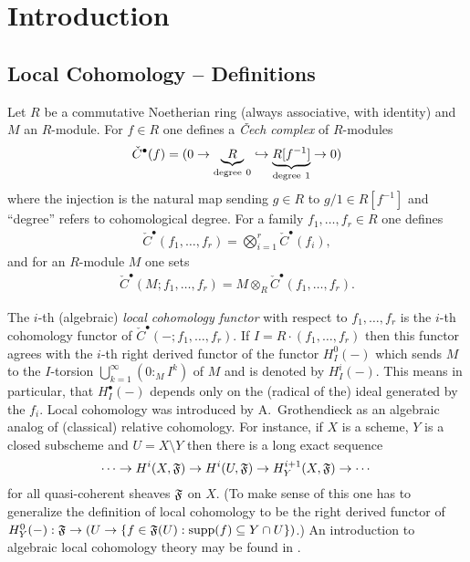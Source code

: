 %


\section{Introduction}

\subsection{Local Cohomology -- Definitions} 
Let $R$ be a commutative Noetherian ring (always associative, 
with identity) and $M$ an 
$R$-module. For $f\in R$ one defines a {\em \v Cech complex} of $R$-modules
\begin{eqnarray}
\check
C^\bullet(f)=(0\to \underbrace{R}_{\text{degree}\ 0}\hookrightarrow 
\underbrace{R[f^{-1}]}_{\text{degree}\ 1}\to 0)
\end{eqnarray}
where
the injection is the natural map sending $g\in R$ to ${g}/{1}\in
R[f^{-1}]$ and ``degree'' refers to  cohomological degree. 
For a family $f_1,\ldots,f_r\in R$ one defines 
\begin{eqnarray}
\check
C^\bullet(f_1,\ldots,f_r)=\bigotimes_{i=1}^r\check C^\bullet(f_i),
\end{eqnarray}
and for
an $R$-module $M$ one sets 
\begin{eqnarray}
\check C^\bullet(M;f_1,\ldots,f_r)=M\otimes_R \check
C^\bullet(f_1,\ldots,f_r).
\end{eqnarray}


The $i$-th (algebraic) {\em local
cohomology functor}
 with respect to $f_1,\ldots,f_r$ is the $i$-th 
cohomology functor of $\check C^\bullet(-;f_1,\ldots,f_r)$. If
$I=R\cdot (f_1,\ldots,f_r)$ then this functor  agrees
with the $i$-th right
derived functor of the functor $H^0_I(-)$ which sends $M$ to the
$I$-torsion $\bigcup_{k=1}^\infty (0:_MI^k)$ of $M$ and is denoted by
$H^i_I(-)$. This means in particular, that $H^\bullet_I(-)$ 
depends only on the (radical of the) ideal generated by
the $f_i$. Local 
cohomology was introduced by A.~Grothendieck \cite{DM:lc-notes}
as an algebraic analog of
(classical) relative cohomology. For instance, if $X$ is a scheme, 
$Y$ is
a closed subscheme and $U=X\setminus Y$ then there is a long exact
sequence 
\[
\cdots\to H^i(X,{\mathfrak F})\to H^i(U,{\mathfrak F})\to H^{i+1}_Y(X,{\mathfrak F})\to\cdots
\]
for all quasi-coherent sheaves ${\mathfrak F}$ on $X$. (To make sense of this one
has to generalize the definition of local cohomology to be the right
derived functor of $H^0_Y(-): {\mathfrak F}\to(U\to\{f\in{\mathfrak F}(U):\operatorname{supp}(f)\subseteq
Y\cap U\})$.)
An introduction to algebraic local
cohomology theory may be found in \cite{DM:B-S}. 

